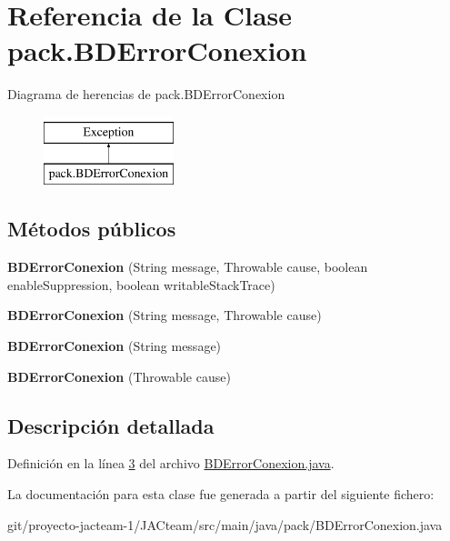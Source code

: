 \hypertarget{classpack_1_1_b_d_error_conexion}{}\section{Referencia de la Clase pack.\+B\+D\+Error\+Conexion}
\label{classpack_1_1_b_d_error_conexion}
Diagrama de herencias de pack.\+B\+D\+Error\+Conexion\begin{figure}[H]
\begin{center}
\leavevmode
\includegraphics[height=2.000000cm]{classpack_1_1_b_d_error_conexion}
\end{center}
\end{figure}
\subsection*{Métodos públicos}
\begin{DoxyCompactItemize}
\item 
\mbox{\label{classpack_1_1_b_d_error_conexion_a4f0619443718c745714f4a9fe3705823}} 
{\bfseries B\+D\+Error\+Conexion} (String message, Throwable cause, boolean enable\+Suppression, boolean writable\+Stack\+Trace)
\item 
\mbox{\label{classpack_1_1_b_d_error_conexion_af8b83985a7cacaa8ee3eedca3da37a22}} 
{\bfseries B\+D\+Error\+Conexion} (String message, Throwable cause)
\item 
\mbox{\label{classpack_1_1_b_d_error_conexion_a4099850605415ee053882502dd22dec5}} 
{\bfseries B\+D\+Error\+Conexion} (String message)
\item 
\mbox{\label{classpack_1_1_b_d_error_conexion_a5faf01f8cb75311496b433b2e71af8ab}} 
{\bfseries B\+D\+Error\+Conexion} (Throwable cause)
\end{DoxyCompactItemize}


\subsection{Descripción detallada}


Definición en la línea \mbox{\hyperlink{_b_d_error_conexion_8java_source_l00003}{3}} del archivo \mbox{\hyperlink{_b_d_error_conexion_8java_source}{B\+D\+Error\+Conexion.\+java}}.



La documentación para esta clase fue generada a partir del siguiente fichero\+:\begin{DoxyCompactItemize}
\item 
git/proyecto-\/jacteam-\/1/\+J\+A\+Cteam/src/main/java/pack/B\+D\+Error\+Conexion.\+java\end{DoxyCompactItemize}
